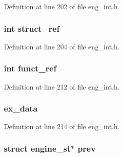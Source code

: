 Definition at line 202 of file eng\+\_\+int.\+h.

\subsubsection[{\texorpdfstring{struct\+\_\+ref}{struct_ref}}]{\setlength{\rightskip}{0pt plus 5cm}int struct\+\_\+ref}\hypertarget{structengine__st_a81a10e0a097523e9a3bf969860eaaf7f}{}\label{structengine__st_a81a10e0a097523e9a3bf969860eaaf7f}


Definition at line 204 of file eng\+\_\+int.\+h.

\subsubsection[{\texorpdfstring{funct\+\_\+ref}{funct_ref}}]{\setlength{\rightskip}{0pt plus 5cm}int funct\+\_\+ref}\hypertarget{structengine__st_a68953c096a57eea2c904bca11e034d16}{}\label{structengine__st_a68953c096a57eea2c904bca11e034d16}


Definition at line 212 of file eng\+\_\+int.\+h.

\subsubsection[{\texorpdfstring{ex\+\_\+data}{ex_data}}]{ ex\+\_\+data}\hypertarget{structengine__st_ac3e4fd59d6ee44a81f3a58114613c1e2}{}\label{structengine__st_ac3e4fd59d6ee44a81f3a58114613c1e2}


Definition at line 214 of file eng\+\_\+int.\+h.

\subsubsection[{\texorpdfstring{prev}{prev}}]{\setlength{\rightskip}{0pt plus 5cm}struct {\bf engine\+\_\+st}$\ast$ prev}\hypertarget{structengine__st_a020cc7e6f120044f438984ca9eb57295}{}\label{structengine__st_a020cc7e6f120044f438984ca9eb57295}


